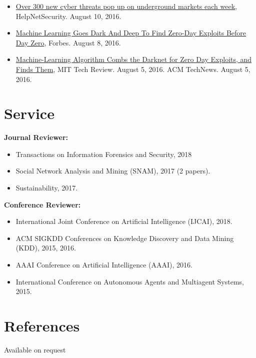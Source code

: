 \documentclass[margin,line]{CV}
\begin{document}
\begin{resume}
\begin{itemize}[leftmargin=*]
\item \href{https://www.helpnetsecurity.com/2016/08/10/cyber-threats-underground-markets/}{Over 300 new cyber threats pop up on underground markets each week}, HelpNetSecurity. August 10, 2016.

\item \href{http://www.forbes.com/sites/kevinmurnane/2016/08/08/machine-learning-goes-dark-and-deep-to-find-zero-day-exploits-before-day-zero/#49b6e2706d76}{ Machine Learning Goes Dark And Deep To Find Zero-Day Exploits Before Day Zero}, Forbes. August 8, 2016.

\item \href{https://www.technologyreview.com/s/602115/machine-learning-algorithm-combs-the-darknet-for-zero-day-exploits-and-finds-them/}{ Machine-Learning Algorithm Combs the Darknet for Zero Day Exploits, and Finds Them},
MIT Tech Review. August 5, 2016. ACM TechNews. August 5, 2016.

\end{itemize}

\section{\sc Service}
{\bf Journal Reviewer:}
\begin{itemize}
	\item Transactions on Information Forensics and Security, 2018
	\item Social Network Analysis and Mining (SNAM), 2017 (2 papers).
	\item Sustainability, 2017. 
\end{itemize}

{\bf Conference Reviewer:}
\begin{itemize}
\item International Joint Conference on Artificial Intelligence (IJCAI), 2018.
\item ACM SIGKDD Conferences on Knowledge Discovery and Data Mining (KDD), 2015, 2016.
\item AAAI Conference on Artificial Intelligence (AAAI), 2016.
\item International Conference on Autonomous Agents and Multiagent Systems, 2015. 
\end{itemize}


\section{\sc References} Available on request

\end{resume}
\end{document}

